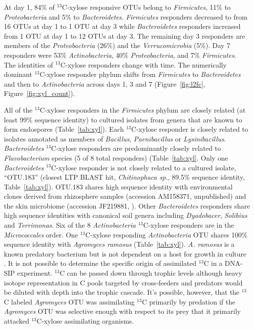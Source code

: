 At day 1, 84\% of $^{13}$C-xylose responsive OTUs belong to
\textit{Firmicutes}, 11\% to \textit{Proteobacteria} and 5\% to
\textit{Bacteroidetes}. \textit{Firmicutes} responders decreased to from 16
OTUs at day 1 to 1 OTU at day 3 while \textit{Bacteroidetes} responders
increased from 1 OTU at day 1 to 12 OTUs at day 3. The remaining day 3
responders are members of the \textit{Proteobacteria} (26\%) and the
\textit{Verrucomicrobia} (5\%). Day 7 responders were 53\%
\textit{Actinobacteria}, 40\% \textit{Proteobacteria}, and 7\%
\textit{Firmicutes}. The identities of $^{13}$C-xylose responders change with
time. The numerically dominant $^{13}$C-xylose responder phylum shifts from
\textit{Firmicutes} to \textit{Bacteroidetes} and then to
\textit{Actinobacteria} across days 1, 3 and 7 (Figure~\ref{fig:l2fc},
Figure~\ref{fig:xyl_count}). 

All of the $^{13}$C-xylose responders in the \textit{Firmicutes} phylum are
closely related (at least 99\% sequence identity) to cultured isolates from
genera that are known to form endospores (Table~\ref{tab:xyl}). Each
$^{13}$C-xylose responder is closely related to isolates annotated as members
of \textit{Bacillus}, \textit{Paenibacillus} or \textit{Lysinibacillus}.
\textit{Bacteroidetes} $^{13}$C-xylose responders are predominantly closely
related to \textit{Flavobacterium} species (5 of 8 total responders)
(Table~\ref{tab:xyl}.  Only one \textit{Bacteroidetes} $^{13}$C-xylose
responder is not closely related to a cultured isolate, ``OTU.183'' (closest
LTP BLAST hit, \textit{Chitinophaca sp.}, 89.5\% sequence identity,
Table~\ref{tab:xyl}). OTU.183 shares high sequence identity with environmental
clones derived from rhizosphere samples (accession AM158371, unpublished) and
the skin microbiome (accession JF219881, \citet{Kong_2012}). Other
\textit{Bacteroidetes} responders share high sequence identities with canonical
soil genera including \textit{Dyadobacer}, \textit{Solibius} and
\textit{Terrimonas}. Six of the 8 \textit{Actinobacteria} $^{13}$C-xylose
responders are in the \textit{Micrococcales} order. One $^{13}$C-xylose
responding \textit{Actinobacteria} OTU shares 100\% sequence identity with
\textit{Agromyces ramosus} (Table~\ref{tab:xyl}).  \textit{A. ramosus} is a
known predatory bacterium but is not dependent on a host for growth in culture
\citep{16346402}. It is not possible to determine the specific origin of
assimilated $^{13}$C in a DNA-SIP experiment. $^{13}$C can be passed down
through trophic levels although heavy isotope representation in C pools
targeted by cross-feeders and predators would be diluted with depth into the
trophic cascade.  It's possible, however, that the $^{13}$C labeled
\textit{Agromyces} OTU was assimilating $^{13}$C primarily by predation if the
\textit{Agromyces} OTU was selective enough with respect to its prey that it
primarily attacked $^{13}$C-xylose assimilating organisms. 

